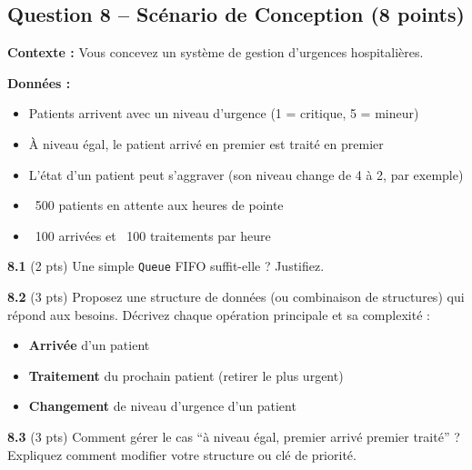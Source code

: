 \documentclass[11pt,letterpaper]{article}
\begin{document}
\newpage

\subsection*{Question 8 -- Scénario de Conception (8 points)}

\textbf{Contexte :} Vous concevez un système de gestion d'urgences hospitalières.

\textbf{Données :}
\begin{itemize}
    \item Patients arrivent avec un niveau d'urgence (1 = critique, 5 = mineur)
    \item À niveau égal, le patient arrivé en premier est traité en premier
    \item L'état d'un patient peut s'aggraver (son niveau change de 4 à 2, par exemple)
    \item ~500 patients en attente aux heures de pointe
    \item ~100 arrivées et ~100 traitements par heure
\end{itemize}

\vspace{0.5em}

\textbf{8.1} (2 pts) Une simple \texttt{Queue} FIFO suffit-elle ? Justifiez.

\vspace{4cm}

\textbf{8.2} (3 pts) Proposez une structure de données (ou combinaison de structures) qui répond aux besoins. Décrivez chaque opération principale et sa complexité :

\begin{itemize}
    \item \textbf{Arrivée} d'un patient
    \item \textbf{Traitement} du prochain patient (retirer le plus urgent)
    \item \textbf{Changement} de niveau d'urgence d'un patient
\end{itemize}

\vspace{8cm}

\textbf{8.3} (3 pts) Comment gérer le cas ``à niveau égal, premier arrivé premier traité'' ? Expliquez comment modifier votre structure ou clé de priorité.

\vspace{5cm}
\end{document}
